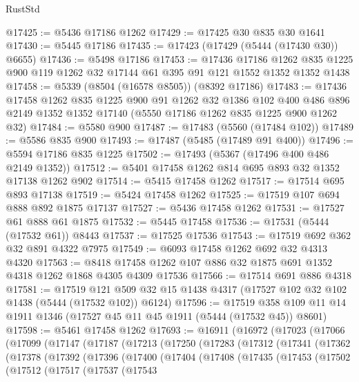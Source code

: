 \begin{lexlean}{RustStd}
\begin{coremodule}
@17425 := @5436 @17186 @1262
@17429 := @17425 @30 @835 @30 @1641
@17430 := @5445 @17186
@17435 := @17423 (@17429 (@5444 (@17430 @30)) @6655)
@17436 := @5498 @17186
@17453 := @17436
    @17186
    @1262
    @835
    @1225
    @900
    @119
    @1262
    @32
    @17144
    @61
    @395
    @91
    @121
    @1552
    @1352
    @1352
    @1438
@17458 := @5339 (@8504 (@16578 @8505)) (@8392 @17186)
@17483 := @17436
    @17458
    @1262
    @835
    @1225
    @900
    @91
    @1262
    @32
    @1386
    @102
    @400
    @486
    @896
    @2149
    @1352
    @1352
    @17140
    (@5550 @17186 @1262 @835 @1225 @900 @1262 @32)
@17484 := @5580 @900
@17487 := @17483 (@5560 (@17484 @102))
@17489 := @5586 @835 @900
@17493 := @17487 (@5485 (@17489 @91 @400))
@17496 := @5594 @17186 @835 @1225
@17502 := @17493 (@5367 (@17496 @400 @486 @2149 @1352))
@17512 := @5401 @17458 @1262 @814 @695 @893 @32 @1352 @17138 @1262 @902
@17514 := @5415 @17458 @1262
@17517 := @17514 @695 @893 @17138
@17519 := @5424 @17458 @1262
@17525 := @17519 @107 @694 @888 @892 @1875 @17137
@17527 := @5436 @17458 @1262
@17531 := @17527 @61 @888 @61 @1875
@17532 := @5445 @17458
@17536 := @17531 (@5444 (@17532 @61)) @8443
@17537 := @17525 @17536
@17543 := @17519 @692 @362 @32 @891 @4322 @7975
@17549 := @6093 @17458 @1262 @692 @32 @4313 @4320
@17563 := @8418 @17458 @1262 @107 @886 @32 @1875 @691 @1352 @4318 @1262 @1868 @4305 @4309 @17536
@17566 := @17514 @691 @886 @4318
@17581 := @17519
    @121
    @509
    @32
    @15
    @1438
    @4317
    (@17527 @102 @32 @102 @1438 (@5444 (@17532 @102)) @6124)
@17596 := @17519 @358 @109 @11 @14 @1911 @1346 (@17527 @45 @11 @45 @1911 (@5444 (@17532 @45)) @8601)
@17598 := @5461 @17458 @1262
@17693 := @16911
    (@16972
      (@17023
        (@17066
          (@17099
            (@17147
              (@17187
                (@17213
                  (@17250
                    (@17283
                      (@17312
                        (@17341
                          (@17362
                            (@17378
                              (@17392
                                (@17396
                                  (@17400
                                    (@17404
                                      (@17408
                                        (@17435
                                          (@17453
                                            (@17502
                                              (@17512
                                                (@17517
                                                  (@17537
                                                    (@17543

\end{coremodule}
\end{lexlean}

